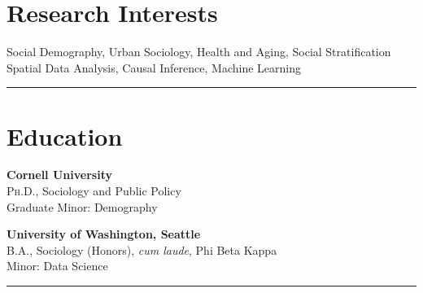 \documentclass[11pt]{article} %
\begin{document}
\section*{Research Interests}

\large{} Social Demography, Urban Sociology, Health and Aging, Social Stratification \\
\large{} Spatial Data Analysis, Causal Inference, Machine Learning \\
\noindent\rule{16cm}{0.4pt}

\section*{Education}
 
  \textbf{Cornell University} \\
 \textsc{Ph.D.}, Sociology and Public Policy \\
	Graduate Minor: Demography
 
 \smallskip
{} \textbf{University of Washington, Seattle} \\
\textsc{B.A.}, Sociology (Honors), \emph{cum laude}, Phi Beta Kappa \\
Minor: Data Science \\

\noindent\rule{16cm}{0.4pt}

\end{document}
